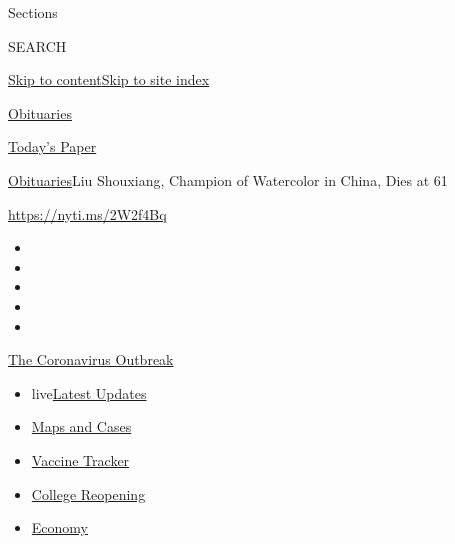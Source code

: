 Sections

SEARCH

\protect\hyperlink{site-content}{Skip to
content}\protect\hyperlink{site-index}{Skip to site index}

\href{https://www.nytimes.com/section/obituaries}{Obituaries}

\href{https://myaccount.nytimes.com/auth/login?response_type=cookie\&client_id=vi}{}

\href{https://www.nytimes.com/section/todayspaper}{Today's Paper}

\href{/section/obituaries}{Obituaries}\textbar{}Liu Shouxiang, Champion
of Watercolor in China, Dies at 61

\url{https://nyti.ms/2W2f4Bq}

\begin{itemize}
\item
\item
\item
\item
\item
\end{itemize}

\href{https://www.nytimes.com/news-event/coronavirus?action=click\&pgtype=Article\&state=default\&region=TOP_BANNER\&context=storylines_menu}{The
Coronavirus Outbreak}

\begin{itemize}
\tightlist
\item
  live\href{https://www.nytimes.com/2020/08/03/world/coronavirus-covid-19.html?action=click\&pgtype=Article\&state=default\&region=TOP_BANNER\&context=storylines_menu}{Latest
  Updates}
\item
  \href{https://www.nytimes.com/interactive/2020/us/coronavirus-us-cases.html?action=click\&pgtype=Article\&state=default\&region=TOP_BANNER\&context=storylines_menu}{Maps
  and Cases}
\item
  \href{https://www.nytimes.com/interactive/2020/science/coronavirus-vaccine-tracker.html?action=click\&pgtype=Article\&state=default\&region=TOP_BANNER\&context=storylines_menu}{Vaccine
  Tracker}
\item
  \href{https://www.nytimes.com/2020/08/02/us/covid-college-reopening.html?action=click\&pgtype=Article\&state=default\&region=TOP_BANNER\&context=storylines_menu}{College
  Reopening}
\item
  \href{https://www.nytimes.com/live/2020/08/03/business/stock-market-today-coronavirus?action=click\&pgtype=Article\&state=default\&region=TOP_BANNER\&context=storylines_menu}{Economy}
\end{itemize}

